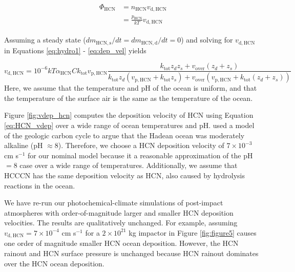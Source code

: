 \begin{align}
\begin{split}
  \Phi_\mathrm{HCN} &= n_\mathrm{HCN} v_\mathrm{d,HCN} \\
  &= \frac{p_\mathrm{HCN}}{k T} v_\mathrm{d,HCN} \label{eq:dep_vel}
\end{split}
\end{align}

Assuming a steady state ($d m_\mathrm{HCN,s}/dt = d m_\mathrm{HCN,d}/dt = 0$) and solving for $v_\mathrm{d,HCN}$ in Equations \eqref{eq:hydro1} - \eqref{eq:dep_vel} yields

\begin{equation}
  v_\mathrm{d,HCN} = 10^{-6} k T \alpha_\mathrm{HCN} C k_\mathrm{tot} v_\mathrm{p,HCN} \frac{k_\mathrm{tot} z_d z_s + v_\mathrm{over} (z_d + z_s)}{k_\mathrm{tot} z_d (v_\mathrm{p,HCN} + k_\mathrm{tot} z_s) + v_\mathrm{over}(v_\mathrm{p,HCN} + k_\mathrm{tot} (z_d + z_s))} \label{eq:HCN_vdep}
\end{equation}
Here, we assume that the temperature and pH of the ocean is uniform, and that the temperature of the surface air is the same as the temperature of the ocean. 

Figure \ref{fig:vdep_hcn} computes the deposition velocity of HCN using Equation \eqref{eq:HCN_vdep} over a wide range of ocean temperatures and pH. \citet{Kadoya_2020} used a model of the geologic carbon cycle to argue that the Hadean ocean was moderately alkaline (pH $\approx 8$). Therefore, we choose a HCN deposition velocity of $7 \times 10^{-3}$ cm s$^{-1}$ for our nominal model because it a reasonable approximation of the pH $= 8$ case over a wide range of temperatures. Additionally, we assume that HCCCN has the same deposition velocity as HCN, also caused by hydrolysis reactions in the ocean.

We have re-run our photochemical-climate simulations of post-impact atmospheres with order-of-magnitude larger and smaller HCN deposition velocities. The results are qualitatively unchanged. For example, assuming $v_\mathrm{d,HCN} = 7 \times 10^{-4}$ cm s$^{-1}$ for a $2 \times 10^{21}$ kg impactor in Figure \ref{fig:figure5} causes one order of magnitude smaller HCN ocean deposition. However, the HCN rainout and HCN surface pressure is unchanged because HCN rainout dominates over the HCN ocean deposition.

